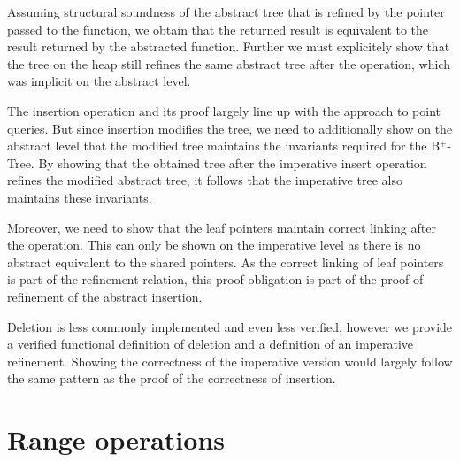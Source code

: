 \documentclass[a4paper,UKenglish,cleveref, autoref, thm-restate]{lipics-v2021}
\newcommand{\btree}{B$^+$-Tree}
\begin{document}
Assuming structural soundness of the abstract tree that is refined by the pointer passed to the function,
we obtain that the returned result is equivalent to the result returned by the abstracted function.
Further we must explicitely show that the tree on the heap
still refines the same abstract tree after the operation,
which was implicit on the abstract level.

The insertion operation and its proof largely line up with the approach to point queries.
But since insertion modifies the tree,
we need to additionally show on the abstract level that the modified tree
maintains the invariants required for the \btree.
By showing that the obtained tree after the imperative insert operation
refines the modified abstract tree, it follows that the imperative tree
also maintains these invariants.

Moreover, we need to show that the leaf pointers
maintain correct linking after the operation.
This can only be shown on the imperative level as there is no abstract equivalent
to the shared pointers.
As the correct linking of leaf pointers is part of the refinement relation,
this proof obligation is part of the proof of refinement of the abstract insertion.



%
%
%

Deletion is less commonly implemented and even less verified,
however we provide a verified functional definition of deletion and a definition of an imperative refinement.
Showing the correctness of the imperative version would largely follow
the same pattern as the proof of the correctness of insertion.



\section{Range operations}
\label{sec:range}
\end{document}
